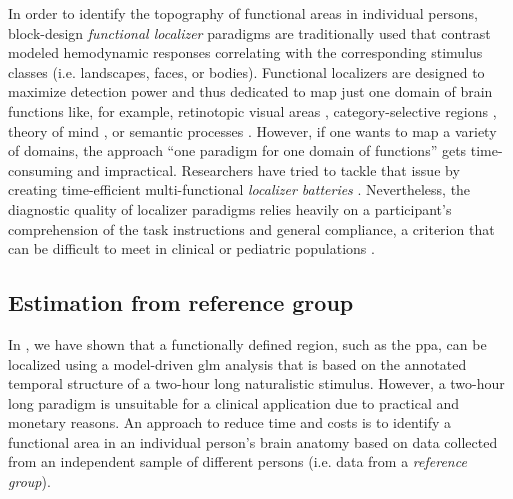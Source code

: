 In order to identify the topography of functional areas in individual persons,
block-design \textit{functional localizer} paradigms are traditionally used that
contrast modeled hemodynamic responses correlating with the corresponding
stimulus classes (i.e. landscapes, faces, or bodies).
Functional localizers are designed to maximize detection power and thus
dedicated to map just one domain of brain functions like, for example,
retinotopic visual areas \citep{wang2015probabilistic}, category-selective
regions \citep{stigliani2015temporal}, theory of mind
\citep{spunt2014validating}, or semantic processes \citep{fedorenko2010new,
fernandez2001language}.
However, if one wants to map a variety of domains, the approach ``one paradigm
for one domain of functions'' gets time-consuming and impractical.
Researchers have tried to tackle that issue by creating time-efficient
multi-functional \textit{localizer batteries} \citep[e.g.,][]{barch2013function,
drobyshevsky2006rapid, pinel2007fast}.
Nevertheless, the diagnostic quality of localizer paradigms relies heavily on a
participant's comprehension of the task instructions and general compliance, a
criterion that can be difficult to meet in clinical or pediatric populations
\citep{eickhoff2020towards, vanderwal2019movies}.


\subsection{Estimation from reference group}


In \citet{haeusler2022processing}, we have shown that a functionally defined
region, such as the \ac{ppa}, can be localized using a model-driven \ac{glm}
analysis that is based on the annotated temporal structure of a two-hour long
naturalistic stimulus.
However, a two-hour long paradigm is unsuitable for a clinical application due
to practical and monetary reasons.
An approach to reduce time and costs is to identify a functional area in an
individual person's brain anatomy based on data collected from an independent
sample of different persons (i.e. data from a \textit{reference group}).



